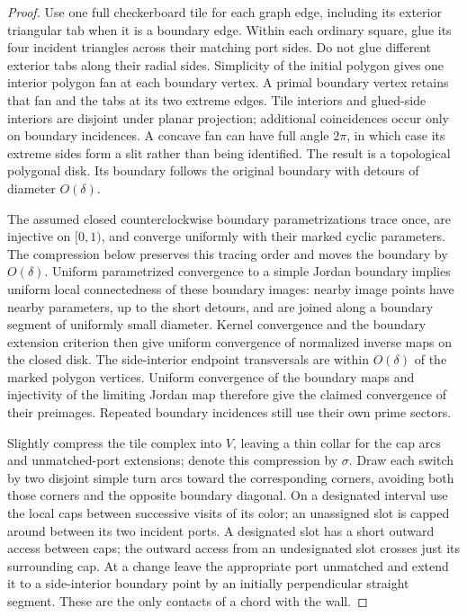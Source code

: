 \begin{proof}
Use one full checkerboard tile for each graph edge, including its
exterior triangular tab when it is a boundary edge.  Within each
ordinary square, glue its four incident triangles across their
matching port sides.  Do not glue different exterior tabs along
their radial sides.  Simplicity of the initial polygon gives one
interior polygon fan at each boundary vertex.  A primal boundary
vertex retains that fan and the tabs at its two extreme edges.
Tile interiors
and glued-side interiors are disjoint under planar projection;
additional coincidences occur only on boundary incidences.
A concave fan can have full angle $2\pi$, in which case its extreme
sides form a slit rather than being identified.  The result is a
topological polygonal disk.  Its boundary follows the original
boundary with detours of diameter $O(\delta)$.

The assumed closed counterclockwise boundary parametrizations trace
once, are injective on $[0,1)$, and converge uniformly with their
marked cyclic parameters.  The compression below preserves this
tracing order and moves the boundary by $O(\delta)$.  Uniform
parametrized convergence to a simple Jordan boundary
implies uniform local connectedness of these boundary images:
nearby image points have nearby parameters, up to the short
detours, and are joined along a boundary segment of uniformly small
diameter.  Kernel convergence and the boundary extension criterion
then give uniform convergence of normalized inverse maps on the
closed disk.  The side-interior endpoint transversals are within
$O(\delta)$ of the marked polygon vertices.  Uniform convergence
of the boundary maps and injectivity of the limiting Jordan map
therefore give the claimed convergence of their preimages.
Repeated boundary incidences still use their own prime sectors.

Slightly compress the tile complex into $V$, leaving a thin collar
for the cap arcs and unmatched-port extensions; denote this
compression by $\sigma$.  Draw each switch by two disjoint simple
turn arcs toward the corresponding corners, avoiding both those
corners and the opposite boundary diagonal.  On a designated
interval use the local caps between successive visits of its color;
an unassigned slot is capped around between its two incident ports.
A designated slot has a short outward access between caps; the
outward access from an undesignated slot crosses just its surrounding
cap.  At a change leave the appropriate port unmatched and extend
it to a side-interior boundary point by an initially perpendicular
straight segment.  These are the only contacts of a chord with the wall.


\end{proof}
